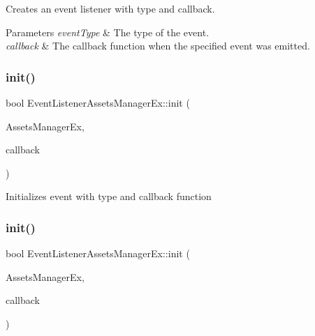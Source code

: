 Creates an event listener with type and callback. 
\begin{DoxyParams}{Parameters}
{\em event\+Type} & The type of the event. \\
\hline
{\em callback} & The callback function when the specified event was emitted. \\
\hline
\end{DoxyParams}
\mbox{\label{classEventListenerAssetsManagerEx_a23a2632c5bab9e93ea6f1ef01b22a1c7}} 
\subsubsection{\texorpdfstring{init()}{init()}\hspace{0.1cm}{\footnotesize\ttfamily [1/2]}}
{\footnotesize\ttfamily bool Event\+Listener\+Assets\+Manager\+Ex\+::init (\begin{DoxyParamCaption}\item[{const \hyperlink{classAssetsManagerEx}{Assets\+Manager\+Ex} $\ast$}]{Assets\+Manager\+Ex,  }\item[{const std\+::function$<$ void(\hyperlink{classEventAssetsManagerEx}{Event\+Assets\+Manager\+Ex} $\ast$)$>$ \&}]{callback }\end{DoxyParamCaption})}

Initializes event with type and callback function \mbox{\label{classEventListenerAssetsManagerEx_a23a2632c5bab9e93ea6f1ef01b22a1c7}} 
\subsubsection{\texorpdfstring{init()}{init()}\hspace{0.1cm}{\footnotesize\ttfamily [2/2]}}
{\footnotesize\ttfamily bool Event\+Listener\+Assets\+Manager\+Ex\+::init (\begin{DoxyParamCaption}\item[{const \hyperlink{classAssetsManagerEx}{Assets\+Manager\+Ex} $\ast$}]{Assets\+Manager\+Ex,  }\item[{const std\+::function$<$ void(\hyperlink{classEventAssetsManagerEx}{Event\+Assets\+Manager\+Ex} $\ast$)$>$ \&}]{callback }\end{DoxyParamCaption})}

